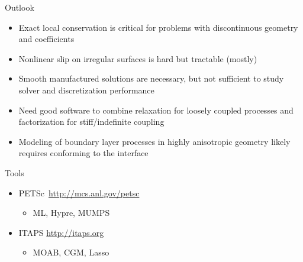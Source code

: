 \documentclass{beamer}
\begin{document}
\begin{frame}{Outlook}
  \begin{block}{}
    \begin{itemize}
    \item Exact local conservation is critical for problems with discontinuous geometry and coefficients
    \item Nonlinear slip on irregular surfaces is hard but tractable (mostly)
    \item Smooth manufactured solutions are necessary, but not sufficient to study solver and discretization performance
    \item Need good software to combine relaxation for loosely coupled processes and factorization
      for stiff/indefinite coupling
    \item Modeling of boundary layer processes in highly anisotropic geometry likely requires conforming to the interface
    \end{itemize}    
  \end{block}
  \begin{block}{Tools}
    \begin{itemize}
    \item PETSc\ \url{http://mcs.anl.gov/petsc}
      \begin{itemize}\item ML, Hypre, MUMPS
      \end{itemize}
    \item ITAPS \url{http://itaps.org}
      \begin{itemize}\item MOAB, CGM, Lasso
      \end{itemize}
    \end{itemize}
  \end{block}
\end{frame}

%
%   
%   
\end{document}

